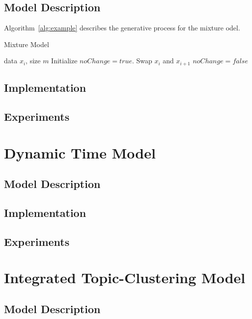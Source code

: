\documentclass{article}
\begin{document}
\subsection{Model Description} 
    Algorithm~\ref{alg:example} describes the generative process for the mixture odel.

    \begin{algorithm}[tb]
       \caption{Mixture Model}
       \label{alg:example}
    \begin{algorithmic}
        data $x_i$, size $m$
       \REPEAT
       \STATE Initialize $noChange = true$.
       \STATE Swap $x_i$ and $x_{i+1}$
       \STATE $noChange = false$
       \ENDIF
       \ENDFOR
    \end{algorithmic}
    \end{algorithm}
\subsection{Implementation} 
\subsection{Experiments} 



\section{Dynamic Time Model} 
\label{dtmsec}
\subsection{Model Description} 
\subsection{Implementation} 
\subsection{Experiments} 




\section{Integrated Topic-Clustering Model} 
\label{intsec}
\subsection{Model Description} 
\end{document}
